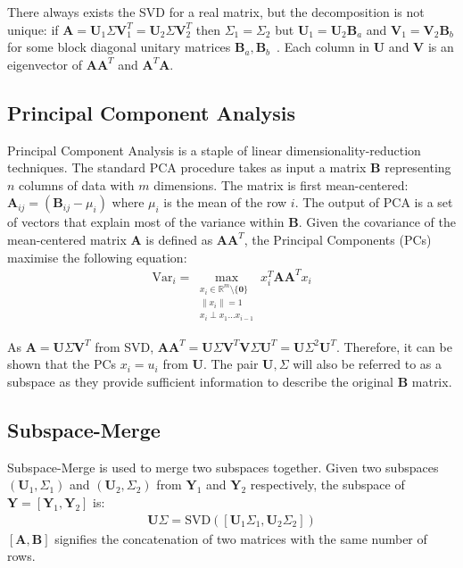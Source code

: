 There always exists the SVD for a real matrix, but the decomposition is not
unique: if $\mathbf{A} = \mathbf{U}_1\Sigma\mathbf{V}_1^T =
\mathbf{U}_2\Sigma\mathbf{V}_2^T$ then $\Sigma_1 = \Sigma_2$ but $\mathbf{U}_1 =
\mathbf{U}_2\mathbf{B}_a$ and $\mathbf{V}_1 = \mathbf{V}_2\mathbf{B}_b$ for some
block diagonal unitary matrices $\mathbf{B}_a,
\mathbf{B}_b$~\cite{eftekhari2019moses, Strang2009}. Each column in
$\mathbf{U}$ and $\mathbf{V}$ is an eigenvector of $\mathbf{AA}^T$ and
$\mathbf{A}^T\mathbf{A}$.

\subsection{Principal Component Analysis}
Principal Component Analysis is a staple of linear dimensionality-reduction
techniques. The standard PCA procedure takes as input a matrix $\mathbf{B}$
representing $n$ columns of data with $m$ dimensions. The matrix is first
mean-centered: $\mathbf{A}_{ij} = (\mathbf{B}_{ij} - \mu_i)$ where $\mu_i$ is
the mean of the row $i$. The output of PCA is a set of vectors that explain most
of the variance within $\mathbf{B}$. Given the covariance of the mean-centered
matrix $\mathbf{A}$ is defined as $\mathbf{AA}^T$, the Principal Components (PCs)
maximise the following equation:
\begin{align}
\text{Var}_i = \max_{\substack{x_i \in \mathbb{R}^m \setminus \{\mathbf{0}\} \\
    \|x_i\|=1 \\ x_i \perp x_1 \dots x_{i-1}}} x_i^T \mathbf{A} \mathbf{A}^T x_i
\end{align}

As $\mathbf{A} = \mathbf{U}\Sigma\mathbf{V}^T$ from SVD,
$\mathbf{AA}^T = \mathbf{U}\Sigma\mathbf{V}^T\mathbf{V}\Sigma\mathbf{U}^T =
\mathbf{U}\Sigma^2\mathbf{U}^T$. Therefore, it can be shown that the PCs
$x_i = u_i$ from $\mathbf{U}$. The pair $\mathbf{U}, \Sigma$ will also be
referred to as a subspace as they provide sufficient information to describe the
original $\mathbf{B}$ matrix.

\subsection{Subspace-Merge}
Subspace-Merge is used to merge two subspaces together. Given two subspaces
$(\mathbf{U}_1, \Sigma_1)$ and $(\mathbf{U}_2, \Sigma_2)$ from $\mathbf{Y}_1$ and
$\mathbf{Y}_2$ respectively, the subspace of $\mathbf{Y} = [\mathbf{Y}_1,
\mathbf{Y}_2]$ is:
\begin{align}
    \mathbf{U}\Sigma = \text{SVD}([\mathbf{U}_1\Sigma_1, \mathbf{U}_2\Sigma_2])
\end{align}
$[\mathbf{A}, \mathbf{B}]$ signifies the concatenation of two matrices with the
same number of rows.

